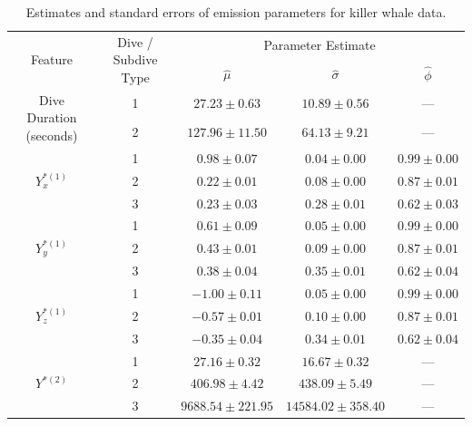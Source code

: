 %
\begin{table}[h!]
    \centering
    \label{table:emis_dists}
    \caption{Estimates and standard errors of emission parameters for killer whale data.}
    \begin{tabular}{ccccc}
    \multirow{2}{*}{Feature}                 & \multirow{2}{*}{Dive / Subdive Type} & \multicolumn{3}{c}{Parameter Estimate}              \\
                                             &                                      & $\hat \mu$      & $\hat \sigma$   & $\hat \phi$     \\ \hline
    \multirow{2}{*}{Dive Duration (seconds)} & 1                                    & $27.23 \pm 0.63$ & $10.89 \pm 0.56$ & ---             \\
                                             & 2                                    & $127.96 \pm 11.50$ & $64.13 \pm 9.21$ & ---             \\ \hline
    \multirow{3}{*}{$Y^{*(1)}_x$}            & 1                                    & $0.98 \pm 0.07$ & $0.04 \pm 0.00$ & $0.99 \pm 0.00$ \\
                                             & 2                                    & $0.22 \pm 0.01$ & $0.08 \pm 0.00$ & $0.87 \pm 0.01$ \\
                                             & 3                                    & $0.23 \pm 0.03$ & $0.28 \pm 0.01$ & $0.62 \pm 0.03$ \\ \hline
    \multirow{3}{*}{$Y^{*(1)}_y$}            & 1                                    & $0.61 \pm 0.09$ & $0.05 \pm 0.00$ & $0.99 \pm 0.00$ \\
                                             & 2                                    & $0.43 \pm 0.01$ & $0.09 \pm 0.00$ & $0.87 \pm 0.01$ \\
                                             & 3                                    & $0.38 \pm 0.04$ & $0.35 \pm 0.01$ & $0.62 \pm 0.04$ \\ \hline
    \multirow{3}{*}{$Y^{*(1)}_z$}            & 1                                    & $-1.00 \pm 0.11$ & $0.05 \pm 0.00$ & $0.99 \pm 0.00$ \\
                                             & 2                                    & $-0.57 \pm 0.01$ & $0.10 \pm 0.00$ & $0.87 \pm 0.01$ \\
                                             & 3                                    & $-0.35 \pm 0.04$ & $0.34 \pm 0.01$ & $0.62 \pm 0.04$ \\ \hline
    \multirow{3}{*}{$Y^{*(2)}$}              & 1                                    & $27.16 \pm 0.32$ & $16.67 \pm 0.32$ & ---             \\
                                             & 2                                    & $406.98 \pm 4.42$ & $438.09 \pm 5.49$ & ---             \\
                                             & 3                                    & $9688.54 \pm 221.95$ & $14584.02 \pm 358.40$ & ---             \\ \hline
    \end{tabular}
\end{table}

